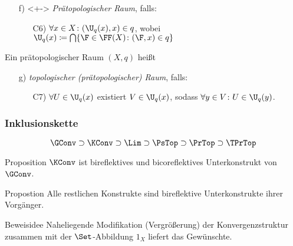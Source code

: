 \begin{frame}
\begin{enumerate}[a)]
\begin{enumerate}
      \end{enumerate}
    \item[f)]<+-> \emph{Prätopologischer Raum}, falls:
      \begin{enumerate}
        \item[C6)] $\forall x \in X \colon (\U_q(x), x) \in q$, wobei $\U_q(x) \coloneqq \bigcap\{ \F \in \FF(X) \colon (\F, x) \in q\}$
      \end{enumerate}
  \end{enumerate}
  \pause
  Ein prätopologischer Raum $(X,q)$ heißt 
  \begin{enumerate}[a)]
    \item[g)] \emph{topologischer (pr\"atopologischer) Raum}, falls:
      \begin{enumerate}
        \item[C7)] $\forall U \in \U_q(x)$ existiert $V \in \U_q(x)$, sodass $\forall y \in V \colon U \in \U_q(y)$.
      \end{enumerate}
  \end{enumerate}
\end{frame}

\begin{frame}
  \frametitle{Inklusionskette}
  $$
  \GConv \supset \KConv \supset \Lim \supset \PsTop \supset \PrTop \supset \TPrTop
  $$

  \begin{block}{Proposition}
    $\KConv$ ist bireflektives und bicoreflektives Unterkonstrukt von $\GConv$.
  \end{block}

  \begin{block}{Propostion}
    Alle restlichen Konstrukte sind bireflektive Unterkonstrukte ihrer Vorg\"anger.
  \end{block}

  \begin{block}{Beweisidee}
    Naheliegende Modifikation (Vergrößerung) der Konvergenzstruktur zusammen mit der $\Set$-Abbildung $1_X$ liefert das Gew\"unschte.
  \end{block}
\end{frame}

